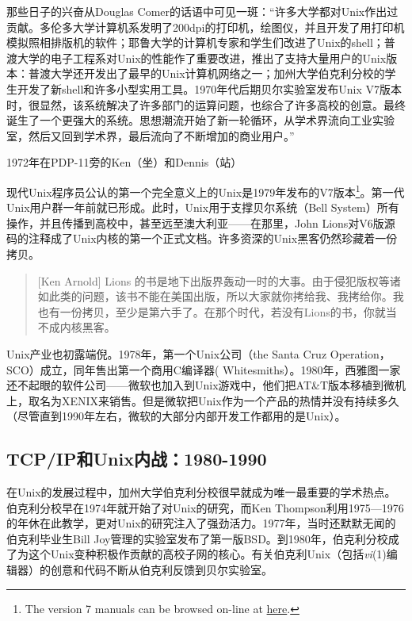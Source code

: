 \documentclass[12pt,oneside]{book}
\begin{document}
\begin{common-format}
那些日子的兴奋从Douglas Comer的话语中可见一斑：“许多大学都对Unix作出过贡献。多伦多大学计算机系发明了200dpi的打印机，绘图仪，并且开发了用打印机模拟照相排版机的软件；耶鲁大学的计算机专家和学生们改进了Unix的shell；普渡大学的电子工程系对Unix的性能作了重要改进，推出了支持大量用户的Unix版本：普渡大学还开发出了最早的Unix计算机网络之一；加州大学伯克利分校的学生开发了新shell和许多小型实用工具。1970年代后期贝尔实验室发布Unix V7版本时，很显然，该系统解决了许多部门的运算问题，也综合了许多高校的创意。最终诞生了一个更强大的系统。思想潮流开始了新一轮循环，从学术界流向工业实验室，然后又回到学术界，最后流向了不断增加的商业用户。”\cite{Comer}
\begin{fig}[7]{1972年在PDP-11旁的Ken（坐）和Dennis（站）}
\label{fig:1972年在PDP-11旁的Ken（坐）和Dennis（站）}
\end{fig}

现代Unix程序员公认的第一个完全意义上的Unix是1979年发布的V7版本\footnote{The version 7 manuals can be browsed on-line at \href{http://plan9.bell-labs.com/7thEdMan/index.html}{here}.}。第一代Unix用户群一年前就已形成。此时，Unix用于支撑贝尔系统（Bell System）所有操作\cite{Hauben}，并且传播到高校中，甚至远至澳大利亚——在那里，John Lions对V6版源码的注释\cite{Lions}成了Unix内核的第一个正式文档。许多资深的Unix黑客仍然珍藏着一份拷贝。

\begin{quote}[Ken Arnold]
Lions 的书是地下出版界轰动一时的大事。由于侵犯版权等诸如此类的问题，该书不能在美国出版，所以大家就你拷给我、我拷给你。我也有一份拷贝，至少是第六手了。在那个时代，若没有Lions的书，你就当不成内核黑客。
\end{quote}

Unix产业也初露端倪。1978年，第一个Unix公司（the Santa Cruz Operation，SCO）成立，同年售出第一个商用C编译器( Whitesmiths）。1980年，西雅图一家还不起眼的软件公司——微软也加入到Unix游戏中，他们把AT\&{}T版本移植到微机上，取名为XENIX来销售。但是微软把Unix作为一个产品的热情并没有持续多久（尽管直到1990年左右，微软的大部分内部开发工作都用的是Unix）。

\subsection{TCP/IP和Unix内战：1980-1990}
在Unix的发展过程中，加州大学伯克利分校很早就成为唯一最重要的学术热点。伯克利分校早在1974年就开始了对Unix的研究，而Ken Thompson利用1975—1976的年休在此教学，更对Unix的研究注入了强劲活力。1977年，当时还默默无闻的伯克利毕业生Bill Joy管理的实验室发布了第一版BSD。到1980年，伯克利分校成了为这个Unix变种积极作贡献的高校子网的核心。有关伯克利Unix（包括\textit{vi}(1)编辑器）的创意和代码不断从伯克利反馈到贝尔实验室。


\end{common-format}
\end{document}
